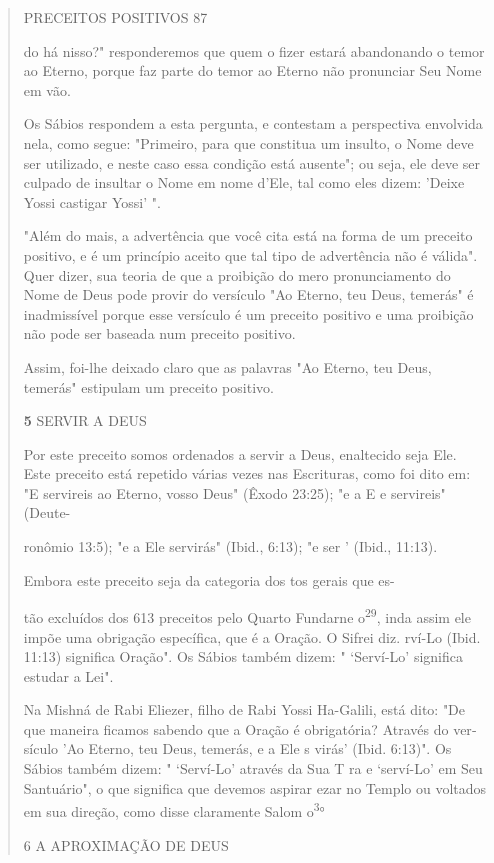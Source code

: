 \begin{quote}
PRECEITOS POSITIVOS 87

do há nisso?" responderemos que quem o fizer estará abandonando o temor
ao Eterno, porque faz parte do temor ao Eterno não pronunciar Seu Nome
em vão.

Os Sábios respondem a esta pergunta, e contestam a perspectiva
en­volvida nela, como segue: "Primeiro, para que constitua um insulto, o
Nome deve ser utilizado, e neste caso essa condição está ausente"; ou
seja, ele deve ser culpado de insultar o Nome em nome d'Ele, tal como
eles dizem: 'Deixe Yossi castigar Yossi' ".

"Além do mais, a advertência que você cita está na forma de um pre­ceito
positivo, e é um princípio aceito que tal tipo de advertência não é
váli­da". Quer dizer, sua teoria de que a proibição do mero
pronunciamento do Nome de Deus pode provir do versículo "Ao Eterno, teu
Deus, temerás" é inad­missível porque esse versículo é um preceito
positivo e uma proibição não po­de ser baseada num preceito positivo.

Assim, foi-lhe deixado claro que as palavras "Ao Eterno, teu Deus,
temerás" estipulam um preceito positivo.

\textbf{5} SERVIR A DEUS

Por este preceito somos ordenados a servir a Deus, enaltecido seja Ele.
Este preceito está repetido várias vezes nas Escrituras, como foi dito
em: "E servireis ao Eterno, vosso Deus" (Êxodo 23:25); "e a E e
servireis" (Deute-

ronômio 13:5); "e a Ele servirás" (Ibid., 6:13); "e ser ' (Ibid.,
11:13).

Embora este preceito seja da categoria dos tos gerais que es-

tão excluídos dos 613 preceitos pelo Quarto Fundarne
o\textsuperscript{29}, inda assim ele im­põe uma obrigação específica,
que é a Oração. O Sifrei diz. rví-Lo (Ibid. 11:13) significa Oração". Os
Sábios também dizem: " `Serví-Lo' significa estudar a Lei".

Na Mishná de Rabi Eliezer, filho de Rabi Yossi Ha-Galili, está dito: "De
que maneira ficamos sabendo que a Oração é obrigatória? Através do
ver­sículo 'Ao Eterno, teu Deus, temerás, e a Ele s virás' (Ibid.
6:13)". Os Sábios também dizem: " `Serví-Lo' através da Sua T ra e
`serví-Lo' em Seu Santuá­rio", o que significa que devemos aspirar ezar
no Templo ou voltados em sua direção, como disse claramente Salom
o\textsuperscript{3}°

6 A APROXIMAÇÃO DE DEUS


\end{quote}
